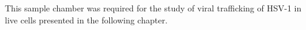 This sample chamber was required for the study of viral trafficking of \gls{HSV}-1 in live cells presented in the following chapter.
%


